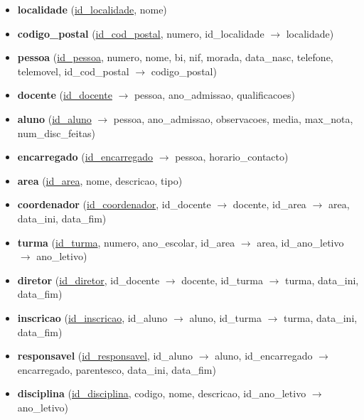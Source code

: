 \documentclass[12pt,a4paper,reqno]{report}
\numberwithin{figure}{section}
\numberwithin{equation}{section}
\begin{document}
\begin{itemize}

\item \textbf{localidade} (\underline{id\_localidade}, nome)

\item \textbf{codigo\_postal} (\underline {id\_cod\_postal}, numero, id\_localidade $\rightarrow$ localidade)

\item \textbf{pessoa} (\underline{id\_pessoa}, numero, nome, bi, nif, morada, data\_nasc, telefone, telemovel, id\_cod\_postal $\rightarrow$ codigo\_postal)

\item \textbf{docente} (\underline{id\_docente} $\rightarrow$ pessoa, ano\_admissao, qualificacoes)

\item \textbf{aluno} (\underline{id\_aluno} $\rightarrow$ pessoa, ano\_admissao, observacoes, media, max\_nota, num\_disc\_feitas)

\item \textbf{encarregado} (\underline{id\_encarregado} $\rightarrow$ pessoa, horario\_contacto)

\item \textbf{area} (\underline{id\_area}, nome, descricao, tipo)

\item \textbf{coordenador} (\underline{id\_coordenador}, id\_docente $\rightarrow$ docente, id\_area $\rightarrow$ area, data\_ini, data\_fim)

\item \textbf{turma} (\underline{id\_turma}, numero, ano\_escolar, id\_area $\rightarrow$ area, id\_ano\_letivo $\rightarrow$ ano\_letivo)

\item \textbf{diretor} (\underline{id\_diretor}, id\_docente $\rightarrow$ docente, id\_turma $\rightarrow$ turma, data\_ini, data\_fim)

\item \textbf{inscricao} (\underline{id\_inscricao}, id\_aluno $\rightarrow$ aluno, id\_turma $\rightarrow$ turma, data\_ini, data\_fim)

\item \textbf{responsavel} (\underline{id\_responsavel}, id\_aluno $\rightarrow$ aluno, id\_encarregado $\rightarrow$ encarregado, parentesco, data\_ini, data\_fim)

\item \textbf{disciplina} (\underline{id\_disciplina}, codigo, nome, descricao, id\_ano\_letivo $\rightarrow$ ano\_letivo)


\end{itemize}
\end{document}
